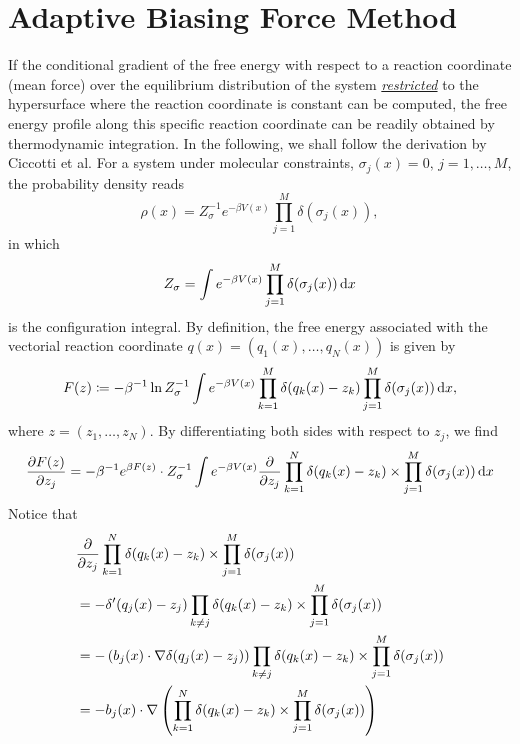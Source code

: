 \section{Adaptive Biasing Force Method\label{Sec:ES:ABF}}
If the conditional gradient of the free energy with respect to a reaction coordinate (mean force) over the equilibrium distribution of the system \underline{\textit{restricted}} to the hypersurface where the reaction coordinate is constant can be computed, the free energy profile along this specific reaction coordinate can be readily obtained by thermodynamic integration. In the following, we shall follow the derivation by Ciccotti et al.\cite{CiccottiCPC2005}
For a system under molecular constraints, $\sigma_j(x)=0,\, j=1,\dots,M$, the probability density reads
\begin{equation}
	\rho(x)=Z_\sigma^{-1}e^{-\beta V(x)}\prod_{j=1}^M\delta(\sigma_j(x)),
\end{equation}
in which
\begin{equation}
	Z_\sigma=\int e^{-\beta V(x)}\prod_{j=1}^M\delta(\sigma_j(x))\mathop{}\!\mathrm{d} x
\end{equation}
is the configuration integral. By definition, the free energy associated with the vectorial reaction coordinate $q(x)=(q_1(x),\dots,q_N(x))$ is given by
\begin{equation}
	F(z)\coloneqq -\beta^{-1}\ln{Z_\sigma^{-1}\int e^{-\beta V(x)}\prod_{k=1}^{M}\delta(q_k(x)-z_k)\prod_{j=1}^M\delta(\sigma_j(x))\mathop{}\!\mathrm{d}x},
\end{equation}
where $z=(z_1,\dots,z_N)$. By differentiating both sides with respect to $z_j$, we find
\begin{equation}
    \frac{\partial F(z)}{\partial z_j}=-\beta^{-1}e^{\beta F(z)}\cdot Z_\sigma^{-1} \int e^{-\beta V(x)}\frac{\partial}{\partial z_j}\prod_{k=1}^{N}\delta(q_k(x)-z_k)\times \prod_{j=1}^M\delta(\sigma_j(x))\mathop{}\!\mathrm{d} x
\end{equation}
Notice that
\begin{align}
    &\frac{\partial}{\partial z_j}\prod_{k=1}^{N}\delta(q_k(x)-z_k)\times \prod_{j=1}^M\delta(\sigma_j(x))\notag\\
    &=-\delta^{\prime}(q_j(x)-z_j)\prod_{k\neq j}\delta(q_k(x)-z_k)\times \prod_{j=1}^M\delta(\sigma_j(x))\notag\\
    &=-\left(b_j(x)\cdot\nabla \delta(q_j(x)-z_j)\right)\prod_{k\neq j}\delta(q_k(x)-z_k)\times \prod_{j=1}^M\delta(\sigma_j(x))\notag\\
    &=-b_j(x)\cdot \nabla\left(\prod_{k=1}^{N}\delta(q_k(x)-z_k)\times \prod_{j=1}^M\delta(\sigma_j(x))\right)
\end{align}
